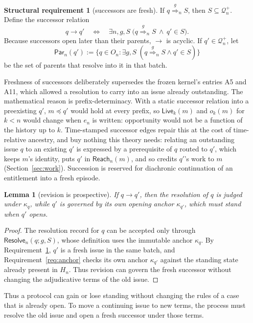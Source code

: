 \documentclass[11pt]{article}
\newtheorem{lemma}{Lemma}
\theoremstyle{definition}
\newtheorem{requirement}{Structural requirement}
\theoremstyle{remark}
\newcommand{\Resolve}{\mathsf{Resolve}}
\newcommand{\Live}{\mathsf{Live}}
\newcommand{\Reach}{\mathsf{Reach}}
\newcommand{\Par}{\mathsf{Par}}
\newcommand{\Born}{\mathcal Q^{+}}
\newcommand{\res}[2]{\overset{#1}{\Longrightarrow}_{#2}}
\begin{document}
\begin{requirement}[successors are fresh]\label{req:fresh-successors}
If $q\res{g}{n}S$, then $S\subseteq\Born_n$. Define the successor relation
\[
 q\to q'
 \quad\Longleftrightarrow\quad
 \exists n,g,S\;\bigl(q\res{g}{n}S\ \wedge\ q'\in S\bigr).
\]
Because successors open later than their parents, $\to$ is acyclic. If
$q'\in\Born_n$, let
\[
 \Par_n(q'):=\{q\in O_n:\exists g,S\;(q\res{g}{n}S\wedge q'\in S)\}
\]
be the set of parents that resolve into it in that batch.

Freshness of successors deliberately supersedes the frozen kernel's entries A5
and A11, which allowed a resolution to carry into an issue already outstanding.
The mathematical reason is prefix-determinacy. With a static successor relation
into a preexisting $q'$, $m\preceq q'$ would hold at every prefix, so
$\Live_k(m)$ and $o_k(m)$ for $k<n$ would change when $e_n$ is written:
opportunity would not be a function of the history up to $k$. Time-stamped
successor edges repair this at the cost of time-relative ancestry, and buy
nothing this theory needs: relating an outstanding issue $q$ to an existing
$q'$ is expressed by a prerequisite of $q$ routed to $q'$, which keeps $m$'s
identity, puts $q'$ in $\Reach_n(m)$, and so credits $q'$'s work to $m$
(Section~\ref{sec:work}). Succession is reserved for diachronic continuation of
an entitlement into a fresh episode.
\end{requirement}

\begin{lemma}[revision is prospective]\label{lem:prospective}
If $q\to q'$, then the resolution of $q$ is judged under $\kappa_q$, while
$q'$ is governed by its own opening anchor $\kappa_{q'}$, which must stand when
$q'$ opens.
\end{lemma}

\begin{proof}
The resolution record for $q$ can be accepted only through
$\Resolve_n(q;g,S)$, whose definition uses the immutable anchor $\kappa_q$. By
Requirement~\ref{req:fresh-successors}, $q'$ is a fresh issue in the same
batch, and Requirement~\ref{req:anchor} checks its own anchor $\kappa_{q'}$
against the standing state already present in $H_n$. Thus revision can govern
the fresh successor without changing the adjudicative terms of the old issue.
\end{proof}

Thus a protocol can gain or lose standing without changing the rules of a case
that is already open. To move a continuing issue to new terms, the process must
resolve the old issue and open a fresh successor under those terms.
\end{document}
